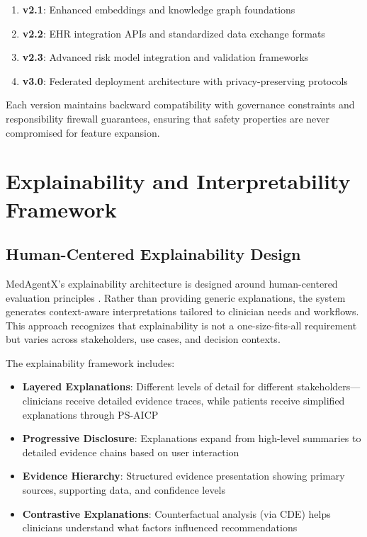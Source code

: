 \documentclass[conference]{IEEEtran}
\begin{document}
\begin{enumerate}
    \item \textbf{v2.1}: Enhanced embeddings and knowledge graph foundations
    \item \textbf{v2.2}: EHR integration APIs and standardized data exchange formats
    \item \textbf{v2.3}: Advanced risk model integration and validation frameworks
    \item \textbf{v3.0}: Federated deployment architecture with privacy-preserving protocols
\end{enumerate}

Each version maintains backward compatibility with governance constraints and responsibility firewall guarantees, ensuring that safety properties are never compromised for feature expansion.

\section{Explainability and Interpretability Framework}

\subsection{Human-Centered Explainability Design}
MedAgentX's explainability architecture is designed around human-centered evaluation principles \cite{xai_human_centered_2025}. Rather than providing generic explanations, the system generates context-aware interpretations tailored to clinician needs and workflows. This approach recognizes that explainability is not a one-size-fits-all requirement but varies across stakeholders, use cases, and decision contexts.

The explainability framework includes:
\begin{itemize}
    \item \textbf{Layered Explanations}: Different levels of detail for different stakeholders—clinicians receive detailed evidence traces, while patients receive simplified explanations through PS-AICP
    \item \textbf{Progressive Disclosure}: Explanations expand from high-level summaries to detailed evidence chains based on user interaction
    \item \textbf{Evidence Hierarchy}: Structured evidence presentation showing primary sources, supporting data, and confidence levels
    \item \textbf{Contrastive Explanations}: Counterfactual analysis (via CDE) helps clinicians understand what factors influenced recommendations
\end{itemize}
\end{document}
